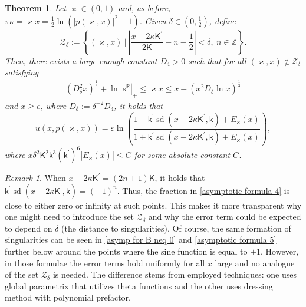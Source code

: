 \documentclass[a4paper,10pt,leqno]{amsart}
\numberwithin{equation}{subsection}
\theoremstyle{plain}
\newtheorem{thm}{Theorem}[section]
\theoremstyle{definition}
\theoremstyle{remark}
\newtheorem*{rem}{Remark}
\theoremstyle{case}
\newcommand{\R}{\mathbb R}
\newcommand{\Z}{\mathbb Z}
\newcommand{\kk}{\mathsf{k}}
\newcommand{\KK}{\mathsf{K}}
\DeclareMathOperator{\sd}{sd}
\begin{document}
\begin{tcolorbox}[colback=white,colframe=gray]
\begin{thm}
\label{thm:4}
Let \( \varkappa\in(0,1)\) and, as before, \( \pi\kappa = \varkappa x = \tfrac12\ln ( |p(\varkappa,x)|^2 - 1 ) \). Given \( \delta\in(0,\tfrac12)\), define
\begin{equation}
\label{Z delta}    
\mathcal Z_\delta := \left\{ (\varkappa,x)~\big|~\left|\frac{x-2\kappa\KK^\prime}{2\KK}-n-\frac12\right|<\delta,~n\in\Z \right\}.
\end{equation}
Then, there exists a large enough constant \( D_4>0 \) such that for all \((\varkappa,x)\notin\mathcal Z_\delta \) satisfying
\begin{align}
\label{D4}
(D_\delta^2x)^{\frac13} + \ln |s^\R|_+ \leq \varkappa x \leq x - ( x^2 D_\delta \ln x)^{\frac13}
\end{align}
and \( x\geq e \), where \( D_\delta := \delta^{-2} D_4 \), it holds that
\begin{equation}
\label{asymptotic formula 4}
u(x,p(\varkappa,x)) = \varepsilon \ln \left(\frac{1 - \kk^\prime \sd(x - 2\kappa \KK^\prime,\kk) + E_\varkappa(x)}{1 + \kk^\prime\sd(x - 2\kappa \KK^\prime,\kk) + E_\varkappa(x)}\right),
\end{equation}
where \( x \delta^2\KK^2\kk^3(\kk^\prime)^6 |E_\varkappa(x)| \leq C \) for some absolute constant \( C \).
\end{thm}
\end{tcolorbox}

\begin{tcolorbox}[colback=white,colframe=gray]
\begin{rem}
When \( x-2\kappa\KK^\prime = (2n+1)\KK \), it holds that \( \kk^\prime \sd(x - 2\kappa \KK^\prime,\kk) = (-1)^n \). Thus, the fraction in \eqref{asymptotic formula 4} is close to either zero or infinity at such points. This makes it more transparent why one might need to introduce the set \( \mathcal Z_\delta \) and why the error term could be expected to depend on \( \delta \) (the distance to singularities). Of course, the same formation of singularities can be seen in \eqref{asymp for B neq 0} and \eqref{asymptotic formula 5} further below around the points where the sine function is equal to \( \pm1 \). However, in those formulae the error terms hold uniformly for all \( x \) large and no analogue of the set \( \mathcal Z_\delta \) is needed. The difference stems from employed techniques: one uses global parametrix that utilizes theta functions and the other uses dressing method with polynomial prefactor.
\end{rem}
\end{tcolorbox}
\end{document}
